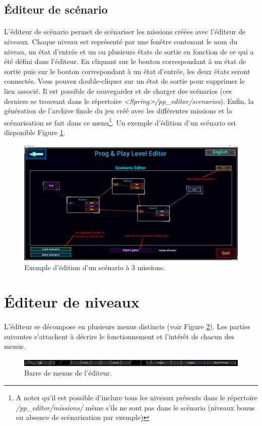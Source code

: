 \documentclass[a4paper]{article}
\begin{document}
\subsection{Éditeur de scénario}
\paragraph{ }
L'éditeur de scénario permet de scénariser les missions créées avec l'éditeur de niveaux. Chaque niveau est représenté par une fenêtre contenant le nom du niveau, un état d'entrée et un ou plusieurs états de sortie en fonction de ce qui a été défini dans l'éditeur. En cliquant sur le bouton correspondant à un état de sortie puis sur le bouton correspondant à un état d'entrée, les deux états seront connectés. Vous pouvez double-cliquer sur un état de sortie pour supprimer le lien associé. Il est possible de sauvegarder et de charger des scénarios (ces derniers se trouvant dans le répertoire \textit{<Spring>/pp\_editor/scenarios}). Enfin, la génération de l'archive finale du jeu créé avec les différentes missions et la scénarisation se fait dans ce menu\footnote{A noter qu'il est possible d'inclure tous les niveaux présents dans le répertoire \textit{/pp\_editor/missions/} même s'ils ne sont pas dans le scénario (niveaux bonus ou absence de scénarisation par exemple)}. Un exemple d'édition d'un scénario est disponible Figure \ref{fig:launcher-scenario}.
\begin{figure}[H]
\centering
\includegraphics[width=\linewidth]{launcher-scenario.png}
\caption{Exemple d'édition d'un scénario à 3 missions.}
\label{fig:launcher-scenario}
\end{figure}
\section{Éditeur de niveaux}
\paragraph{ }
L'éditeur se décompose en plusieurs menus distincts (voir Figure \ref{fig:editor-topbar}). Les parties suivantes s'attachent à décrire le fonctionnement et l'intérêt de chacun des menus.
\begin{figure}[H]
\centering
\includegraphics[width=\linewidth]{editor-topbar.png}
\caption{Barre de menus de l'éditeur.}
\label{fig:editor-topbar}
\end{figure}
\end{document}
